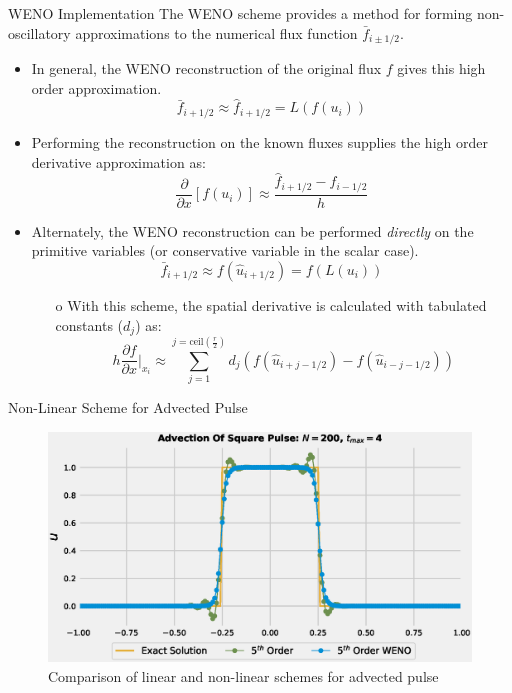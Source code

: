 \documentclass[9pt]{beamer}
\begin{document}
\begin{frame}{WENO Implementation}
  The WENO scheme provides a method for forming non-oscillatory approximations to the numerical flux function $\bar{f}_{i\pm 1/2}$. 
\begin{itemize}
  \item In general, the WENO reconstruction of the original flux $f$ gives this high order approximation.
  $$\bar{f}_{i+1/2} \approx \hat{f}_{i+1/2} = L(f(u_i))$$
  \item  Performing the reconstruction on the known fluxes supplies the high order derivative approximation as:
  $$\frac{\partial}{\partial x}[f(u_i)] \approx \frac{\hat{f}_{i+1 /2} - \hat{f}_{i-1/2}}{h}$$
  \item Alternately, the WENO reconstruction can be performed \textit{directly} on the primitive variables (or conservative variable in the scalar case).
  $$\bar{f}_{i+1/2} \approx f(\hat{u}_{i+1/2}) = f(L(u_i))$$
  \begin{itemize}
    \item[o] With this scheme, the spatial derivative is calculated with tabulated constants ($d_j$) as\cite{Shahbazi}:
    $$	h\frac{\partial f}{\partial x}\bigg|_{x_i}\approx \sum_{j=1}^{j=\text{ceil}(\tfrac{r}{2})}d_j(f(\hat{u}_{i+j-1/2})-f(\hat{u}_{i-j-1/2}))$$
  \end{itemize}
\end{itemize}
\end{frame}

\begin{frame}{Non-Linear Scheme for Advected Pulse}
  \begin{figure}[H]
    \centering
    \includegraphics[scale=0.45]{AdvectionHighOrderComparison_pulseWENO.eps}\caption{Comparison of linear and non-linear schemes for advected pulse}
    \end{figure}
\end{frame}
\end{document}
